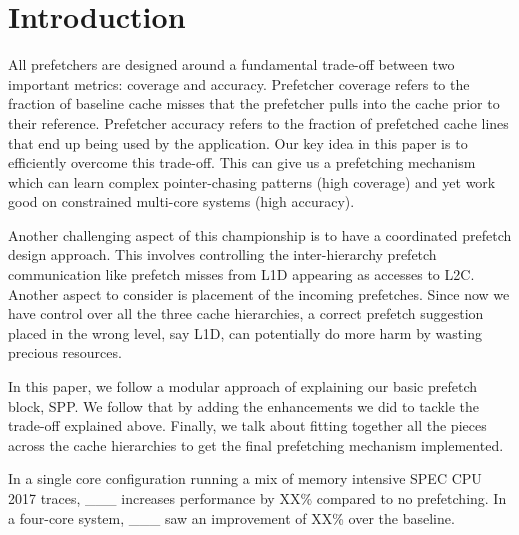 \section{Introduction}
\label{Introduction}

All prefetchers are designed around a fundamental trade-off between
two important metrics: coverage and accuracy. Prefetcher coverage
refers to the fraction of baseline cache misses that the prefetcher
pulls into the cache prior to their reference. Prefetcher
accuracy refers to the fraction of prefetched cache lines that end up
being used by the application. Our key idea in this paper is to 
efficiently overcome this trade-off. This can give us a prefetching 
mechanism which can learn complex pointer-chasing patterns (high coverage)
and yet work good on constrained multi-core systems (high accuracy).

Another challenging aspect of this championship is to have a coordinated 
prefetch design approach. This involves controlling the inter-hierarchy 
prefetch communication like prefetch misses from L1D appearing as accesses 
to L2C. Another aspect to consider is placement of the incoming prefetches.
Since now we have control over all the three cache hierarchies, a correct 
prefetch suggestion placed in the wrong level, say L1D, can potentially 
do more harm by wasting precious resources.

In this paper, we follow a modular approach of explaining our basic prefetch
block, SPP. We follow that by adding the enhancements we did to tackle the 
trade-off explained above. Finally, we talk about fitting together all the 
pieces across the cache hierarchies to get the final prefetching mechanism 
implemented.

In a single core configuration running a mix of memory intensive SPEC CPU 
2017 traces, \_\_\_ increases performance by XX\% compared to no prefetching. 
In a four-core system, \_\_\_ saw an improvement of XX\% over the baseline.
